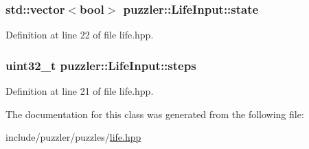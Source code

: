 \subsubsection[{state}]{\setlength{\rightskip}{0pt plus 5cm}std\+::vector$<$bool$>$ puzzler\+::\+Life\+Input\+::state}\label{a00010_ac1dd04f4621b6d7130b52c7f62edaee7}


Definition at line 22 of file life.\+hpp.

\hypertarget{a00010_a3d89eae18dea2d1f3cbd2656b6442dfd}{}
\subsubsection[{steps}]{\setlength{\rightskip}{0pt plus 5cm}uint32\+\_\+t puzzler\+::\+Life\+Input\+::steps}\label{a00010_a3d89eae18dea2d1f3cbd2656b6442dfd}


Definition at line 21 of file life.\+hpp.



The documentation for this class was generated from the following file\+:\begin{DoxyCompactItemize}
\item 
include/puzzler/puzzles/\hyperlink{a00130}{life.\+hpp}\end{DoxyCompactItemize}
